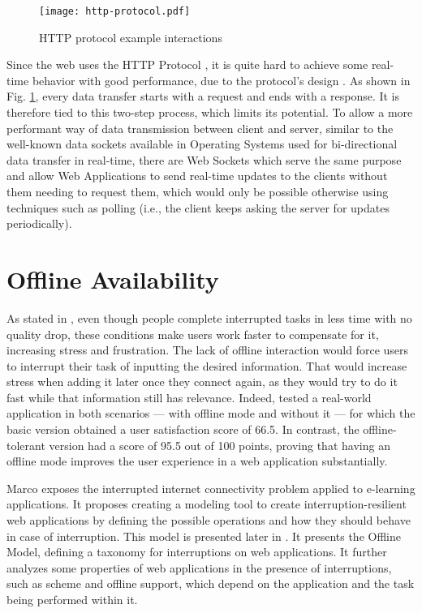 \begin{figure}[t]
    \begin{center}
      \leavevmode
      \texttt{[image: http-protocol.pdf]}
      \caption{HTTP protocol example interactions}
      \label{fig:http-protocol}
    \end{center}
  \end{figure}

  Since the web uses the HTTP Protocol \cite{http1-1protocol} \cite{http2protocol}, it is quite hard to achieve some real-time behavior with good performance, due to the protocol's design \cite{Spero1994}. As shown in Fig. \ref{fig:http-protocol}, every data transfer starts with a request and ends with a response. It is therefore tied to this two-step process, which limits its potential. To allow a more performant way of data transmission between client and server, similar to the well-known data sockets available in Operating Systems used for bi-directional data transfer in real-time, there are Web Sockets \cite{websocket-protocol} which serve the same purpose and allow Web Applications to send real-time updates to the clients without them needing to request them, which would only be possible otherwise using techniques such as polling (i.e., the client keeps asking the server for updates periodically). 

\section{Offline Availability}\label{sec:offline-avail-sota}

As stated in \cite{Mark2008}, even though people complete interrupted tasks in less time with no quality drop, these conditions make users work faster to compensate for it, increasing stress and frustration. The lack of offline interaction would force users to interrupt their task of inputting the desired information. That would increase stress when adding it later once they connect again, as they would try to do it fast while that information still has relevance. Indeed, \cite{Marco2015} tested a real-world application in both scenarios --- with offline mode and without it --- for which the basic version obtained a user satisfaction score of 66.5. In contrast, the offline-tolerant version had a score of 95.5 out of 100 points, proving that having an offline mode improves the user experience in a web application substantially. 

Marco \cite{Marco2013} exposes the interrupted internet connectivity problem applied to e-learning applications. It proposes creating a modeling tool to create interruption-resilient web applications by defining the possible operations and how they should behave in case of interruption. This model is presented later in \cite{Abertos-Marco2017}. It presents the Offline Model, defining a taxonomy for interruptions on web applications. It further analyzes some properties of web applications in the presence of interruptions, such as scheme and offline support, which depend on the application and the task being performed within it.

